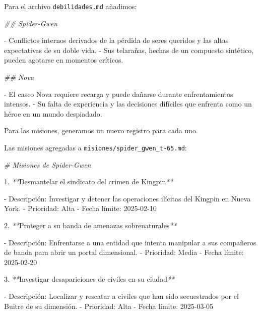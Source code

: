 \documentclass[
]{book}
\newenvironment{Shaded}{\begin{snugshade}}{\end{snugshade}}
\newcommand{\CommentTok}[1]{\textcolor[rgb]{0.56,0.35,0.01}{\textit{#1}}}
\newcommand{\ExtensionTok}[1]{#1}
\newcommand{\NormalTok}[1]{#1}
\newcommand{\PreprocessorTok}[1]{\textcolor[rgb]{0.56,0.35,0.01}{\textit{#1}}}
\begin{document}
Para el archivo \texttt{debilidades.md} añadimos:

\begin{Shaded}
\begin{Highlighting}[]

\CommentTok{\#\# Spider{-}Gwen}

\ExtensionTok{{-}}\NormalTok{ Conflictos internos derivados de la pérdida de seres queridos y las altas expectativas de su doble vida.}
\ExtensionTok{{-}}\NormalTok{ Sus telarañas, hechas de un compuesto sintético, pueden agotarse en momentos críticos.}

\CommentTok{\#\# Nova}

\ExtensionTok{{-}}\NormalTok{ El casco Nova requiere recarga y puede dañarse durante enfrentamientos intensos.}
\ExtensionTok{{-}}\NormalTok{ Su falta de experiencia y las decisiones difíciles que enfrenta como un héroe en un mundo despiadado.}
\end{Highlighting}
\end{Shaded}

Para las misiones, generamos un nuevo registro para cada uno.

Las misiones agregadas a \texttt{misiones/spider\_gwen\_t-65.md}:

\begin{Shaded}
\begin{Highlighting}[]
\CommentTok{\# Misiones de Spider{-}Gwen}

\ExtensionTok{1.} \PreprocessorTok{**}\NormalTok{Desmantelar el sindicato del crimen de Kingpin}\PreprocessorTok{**}

   \ExtensionTok{{-}}\NormalTok{ Descripción: Investigar y detener las operaciones ilícitas del Kingpin en Nueva York.}
   \ExtensionTok{{-}}\NormalTok{ Prioridad: Alta}
   \ExtensionTok{{-}}\NormalTok{ Fecha límite: 2025{-}02{-}10}

\ExtensionTok{2.} \PreprocessorTok{**}\NormalTok{Proteger a su banda de amenazas sobrenaturales}\PreprocessorTok{**}

   \ExtensionTok{{-}}\NormalTok{ Descripción: Enfrentarse a una entidad que intenta manipular a sus compañeros de banda para abrir un portal dimensional.}
   \ExtensionTok{{-}}\NormalTok{ Prioridad: Media}
   \ExtensionTok{{-}}\NormalTok{ Fecha límite: 2025{-}02{-}20}

\ExtensionTok{3.} \PreprocessorTok{**}\NormalTok{Investigar desapariciones de civiles en su ciudad}\PreprocessorTok{**}

   \ExtensionTok{{-}}\NormalTok{ Descripción: Localizar y rescatar a civiles que han sido secuestrados por el Buitre de su dimensión.}
   \ExtensionTok{{-}}\NormalTok{ Prioridad: Alta}
   \ExtensionTok{{-}}\NormalTok{ Fecha límite: 2025{-}03{-}05}
\end{Highlighting}
\end{Shaded}
\end{document}
